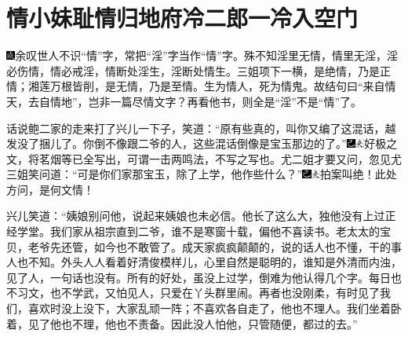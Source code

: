 
\chapter{情小妹耻情归地府\hspace{.5em}冷二郎一冷入空门}

{\includegraphics[width=3mm]{../Images/00005}\kaishu 余叹世人不识``情''字，常把``淫''字当作``情''字。殊不知淫里无情，情里无淫，淫必伤情，情必戒淫，情断处淫生，淫断处情生。三姐项下一横，是绝情，乃是正情；湘莲万根皆削，是无情，乃是至情。生为情人，死为情鬼。故结句曰``来自情天，去自情地''，岂非一篇尽情文字？再看他书，则全是``淫''不是``情''了。}

话说鲍二家的走来打了兴儿一下子，笑道：``原有些真的，叫你又编了这混话，越发没了捆儿了。你倒不像跟二爷的人，这些混话倒像是宝玉那边的了。''{\includegraphics[width=3mm]{../Images/00003}\includegraphics[width=3mm]{../Images/00012}\footnotesize \kaishu 好极之文，将茗烟等已全写出，可谓一击两鸣法，不写之写也。}尤二姐才要又问，忽见尤三姐笑问道：``可是你们家那宝玉，除了上学，他作些什么？''{\includegraphics[width=3mm]{../Images/00003}\includegraphics[width=3mm]{../Images/00012}\footnotesize \kaishu 拍案叫绝！此处方问，是何文情！}

兴儿笑道：``姨娘别问他，说起来姨娘也未必信。他长了这么大，独他没有上过正经学堂。我们家从祖宗直到二爷，谁不是寒窗十载，偏他不喜读书。老太太的宝贝，老爷先还管，如今也不敢管了。成天家疯疯颠颠的，说的话人也不懂，干的事人也不知。外头人人看着好清俊模样儿，心里自然是聪明的，谁知是外清而内浊，见了人，一句话也没有。所有的好处，虽没上过学，倒难为他认得几个字。每日也不习文，也不学武，又怕见人，只爱在丫头群里闹。再者也没刚柔，有时见了我们，喜欢时没上没下，大家乱顽一阵；不喜欢各自走了，他也不理人。我们坐着卧着，见了他也不理，他也不责备。因此没人怕他，只管随便，都过的去。''

